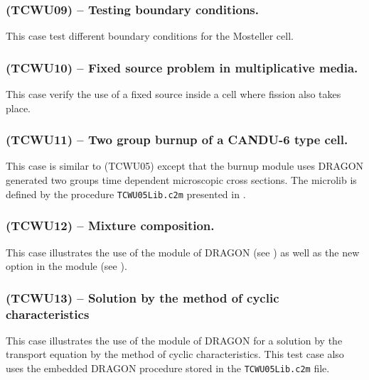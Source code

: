 
\subsubsection{\tst(TCWU09) -- Testing boundary conditions.}

This case test different boundary conditions for the Mosteller cell.


\subsubsection{\tst(TCWU10) -- Fixed source problem in multiplicative media.}

This case verify the use of a fixed source inside a cell where fission also
takes place.


\subsubsection{\tst(TCWU11) -- Two group burnup of a CANDU-6 type cell.}

This case is similar to \tst(TCWU05) except that the burnup module
uses DRAGON generated two groups time dependent microscopic cross sections.
The {\sc microlib} is defined by the procedure {\tt TCWU05Lib.c2m} presented in .


\subsubsection{\tst(TCWU12) -- Mixture composition.}

This case illustrates the use of the  module of DRAGON 
(see ) as well as the new  option in the module 
 (see ).


\subsubsection{\tst(TCWU13) -- Solution by the method of cyclic characteristics}\label{sect:ExTCWU13}

This case illustrates the use of the  module of DRAGON for a solution by the transport equation by the method of cyclic
characteristics. This test case also uses the embedded DRAGON procedure stored in the {\tt TCWU05Lib.c2m} file.

